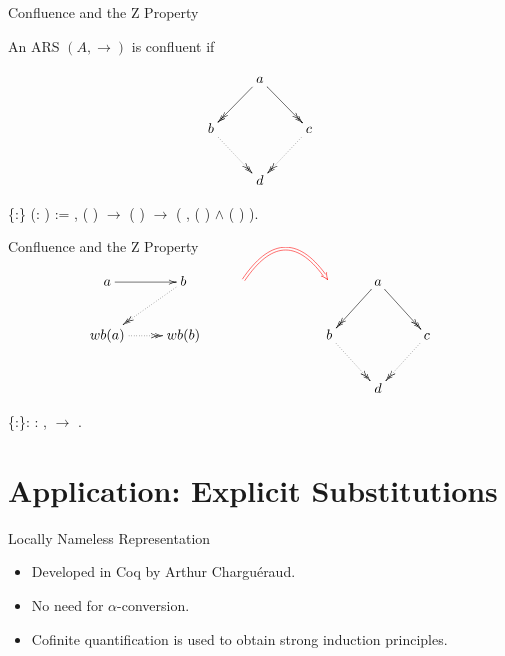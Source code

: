 \documentclass[10pt]{beamer}
\begin{document}
\begin{frame}[fragile]{Confluence and the Z Property}
  
  \begin{definition}[Confluence]
    An ARS $(A,\to)$ is confluent if
    
    \[
      \xymatrix{
        & a \ar@{->>}[dl] \ar@{->>}[dr] & \\
        b \ar@{.>>}[dr] &  & c \ar@{.>>}[dl] \\
        & d & 
      }
    \]
  \end{definition}
  
  \begin{coqdoccode}
      \{:\} (:  ) := \coqdockw{\ensuremath{\forall}}   , ( )   \ensuremath{\rightarrow} ( )   \ensuremath{\rightarrow} (\coqdoctac{\ensuremath{\exists}} , ( )   \ensuremath{\land} ( )  ).\coqdoceol
  \end{coqdoccode}
\end{frame}

\begin{frame}[fragile]{Confluence and the Z Property}
  
  \[
    \xymatrix{
      a \ar[r] &  b \ar@{.>>}[dl] & \ar@/^2.0pc/@{=>}@[red][rr] & &    & a \ar@{->>}[dl] \ar@{->>}[dr] & \\ 
      wb(a) \ar@{.>>}[r] & wb(b) & & &   b \ar@{.>>}[dr] &  & c \ar@{.>>}[dl] \\
      & & & &       & d & 
            }
  \]
  
  \begin{coqdoccode}
      \{:\}: \coqdockw{\ensuremath{\forall}} :  ,   \ensuremath{\rightarrow}  .\coqdoceol
  \end{coqdoccode}
\end{frame}

\section{Application: Explicit Substitutions}

\begin{frame}[fragile]{Locally Nameless Representation}
\begin{itemize}
\item Developed in Coq by Arthur Charguéraud.
\item No need for $\alpha$-conversion.
\item Cofinite quantification is used to obtain strong induction principles.
\end{itemize}
\end{frame}


\end{document}
